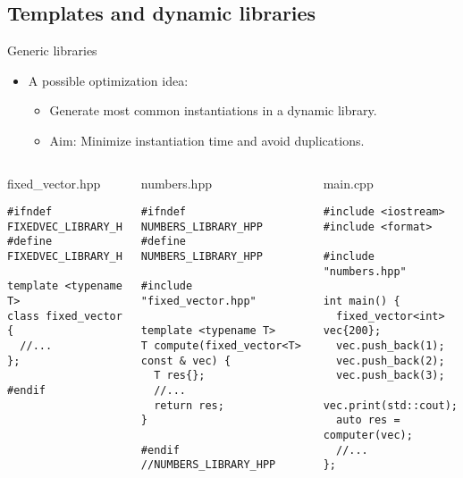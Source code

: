 \subsection{Templates and dynamic libraries}

\begin{frame}[t,fragile]{Generic libraries}
\begin{itemize}
  \item A possible optimization idea:
    \begin{itemize}
      \item Generate most common instantiations in a dynamic library.
      \item Aim: Minimize instantiation time and avoid duplications.
    \end{itemize}
\end{itemize}

\begin{columns}[T]

\begin{block}{fixed\_vector.hpp}
\begin{lstlisting}[basicstyle=\tiny]
#ifndef FIXEDVEC_LIBRARY_H
#define FIXEDVEC_LIBRARY_H

template <typename T>
class fixed_vector {
  //...
};

#endif
\end{lstlisting}
\end{block}


\begin{block}{numbers.hpp}
\begin{lstlisting}[basicstyle=\tiny]
#ifndef NUMBERS_LIBRARY_HPP
#define NUMBERS_LIBRARY_HPP

#include "fixed_vector.hpp"

template <typename T>
T compute(fixed_vector<T> const & vec) {
  T res{};
  //...
  return res;
}

#endif //NUMBERS_LIBRARY_HPP

\end{lstlisting}
\end{block}

\begin{block}{main.cpp}
\begin{lstlisting}[basicstyle=\tiny]
#include <iostream>
#include <format>

#include "numbers.hpp"

int main() {
  fixed_vector<int> vec{200};
  vec.push_back(1);
  vec.push_back(2);
  vec.push_back(3);
  vec.print(std::cout);
  auto res = computer(vec);
  //...
};
\end{lstlisting}
\end{block}
\end{columns}
\end{frame}

